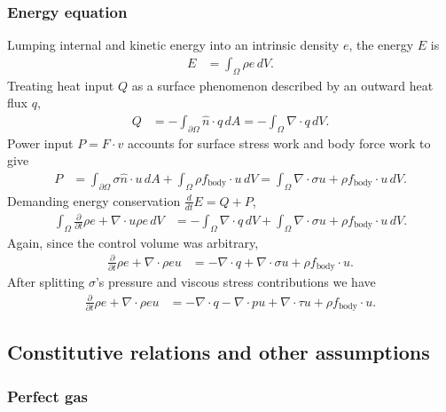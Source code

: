 \documentclass[letterpaper,11pt,nointlimits,reqno]{amsart}
\begin{document}
\subsubsection{Energy equation} 
Lumping internal and kinetic energy into an intrinsic density $e$, 
the energy $E$ is
\begin{align}
  E &= \int_{\Omega} \rho{}e \, dV 
  .
\end{align}
Treating heat input $Q$ as a surface phenomenon described by an outward
heat flux $q$, 
\begin{align}
  Q 
  &= 
  -\int_{\partial\Omega}\hat{n}\cdot{}q\,dA
  =
  -\int_{\Omega}\nabla\cdot{}q\,dV
  .
\end{align}
Power input $P=F\cdot{}v$ accounts for surface stress work and body force work
to give
\begin{align}
  P 
  &= 
    \int_{\partial\Omega} \sigma{}\hat{n} \cdot{} u \, dA 
  + \int_{\Omega} \rho{}f_\text{body} \cdot{} u \, dV 
  = \int_{\Omega} \nabla\cdot{}\sigma{}u + \rho{}f_\text{body} \cdot{} u \, dV 
  .
\end{align}
Demanding energy conservation $\frac{d}{dt}E=Q+P$,
\begin{align}
  \int_{\Omega}\frac{\partial}{\partial{}t} \rho{}e
  +
  \nabla\cdot{}u\rho{}e
  \,dV
&=
  - \int_{\Omega}\nabla\cdot{}q\,dV
  + \int_{\Omega} \nabla\cdot\sigma{}u + \rho{}f_\text{body} \cdot{} u \, dV 
  .
\end{align}
Again, since the control volume was arbitrary, 
\begin{align}
  \frac{\partial}{\partial{}t} \rho{}e
  +
  \nabla\cdot{}\rho{}eu
&=
  - \nabla\cdot{}q + \nabla\cdot\sigma{}u + \rho{}f_\text{body} \cdot{} u 
  .
\end{align}
After splitting $\sigma$'s pressure and viscous stress contributions we have
\begin{align}
  \label{eq:cons_energy}
  \frac{\partial}{\partial{}t} \rho{}e
  +
  \nabla\cdot{}\rho{}eu
&=
  - \nabla\cdot{}q 
  - \nabla\cdot{}pu
  + \nabla\cdot{}\tau{}u
  + \rho{}f_\text{body} \cdot{} u 
  .
\end{align}

\subsection{Constitutive relations and other assumptions}

\subsubsection{Perfect gas}
\end{document}
